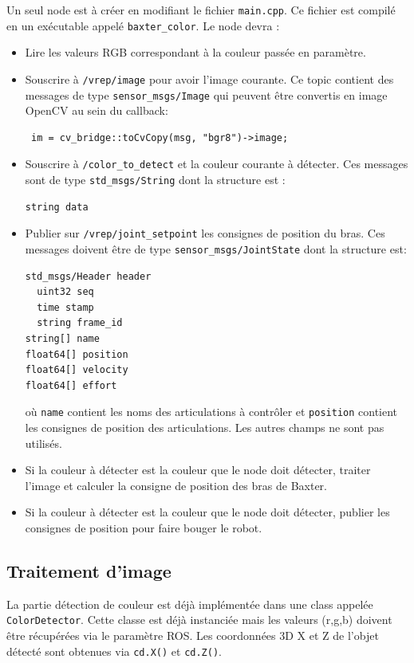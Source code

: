 \documentclass{ecnreport}
\begin{document}
Un seul node est à créer en modifiant le fichier \texttt{main.cpp}. Ce fichier est compilé en un exécutable appelé \texttt{baxter\_color}. 
Le node devra :
\begin{itemize}
\item Lire les valeurs RGB correspondant à la couleur passée en paramètre.
\item Souscrire à \texttt{/vrep/image} pour avoir l'image courante. Ce topic contient des messages de type \texttt{sensor\_msgs/Image} qui peuvent être convertis en image OpenCV au sein du callback:
\cppstyle
\begin{lstlisting}
 im = cv_bridge::toCvCopy(msg, "bgr8")->image; 
\end{lstlisting}
\item Souscrire à \texttt{/color\_to\_detect} et la couleur courante à détecter. Ces messages sont de type \texttt{std\_msgs/String} dont la structure est :
\begin{lstlisting}
string data
\end{lstlisting} 
 \item Publier sur \texttt{/vrep/joint\_setpoint} les consignes de position du bras. Ces messages doivent être de type \texttt{sensor\_msgs/JointState} dont la structure est:
\begin{lstlisting}
std_msgs/Header header
  uint32 seq
  time stamp
  string frame_id
string[] name
float64[] position
float64[] velocity
float64[] effort
 \end{lstlisting} où \texttt{name} contient les noms des articulations à contrôler et \texttt{position} contient les consignes de position des articulations. Les autres champs
 ne sont pas utilisés.
 \item Si la couleur à détecter est la couleur que le node doit détecter, traiter l'image et calculer la consigne de position des bras de Baxter.
 \item Si la couleur à détecter est la couleur que le node doit détecter, publier les consignes de position pour faire bouger le robot.
\end{itemize}

\subsection{Traitement d'image}

La partie détection de couleur est déjà implémentée dans une class appelée  \texttt{ColorDetector}. Cette classe est déjà instanciée mais les valeurs (r,g,b) doivent être 
récupérées via le paramètre ROS. Les coordonnées 3D X et Z de l'objet détecté sont obtenues via \texttt{cd.X()} et \texttt{cd.Z()}.
\end{document}
